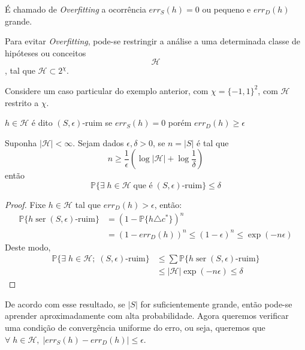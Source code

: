 \begin{definicao}
É chamado de \emph{Overfitting} a ocorrência $err_S(h) = 0$ ou pequeno e $err_D(h)$ grande.
\end{definicao}{}

Para evitar \emph{Overfitting}, pode-se restringir a análise a uma determinada classe de hipóteses ou conceitos $$\mathcal{H}$$, tal que $\mathcal{H} \subset 2^\chi$.

\begin{exemplo}
Considere um caso particular do exemplo anterior, com $\chi = \{-1,1\}^2$, com $\mathcal{H}$ restrito a $\chi$.
\end{exemplo}{}

\begin{definicao}
$h \in \mathcal{H}$ é dito $(S, \epsilon)\text{-ruim}$ se $err_S(h) = 0$ porém $err_D(h) \geq \epsilon$
\end{definicao}{}

\begin{teorema}
Suponha $|\mathcal{H}| < \infty$. Sejam dados  $\epsilon, \delta > 0$, se $n = |S|$ é tal que
\begin{equation*}
n \geq \frac{1}{\epsilon}\left(\log{|\mathcal{H}|} + \log{\frac{1}{\delta}}\right)
\end{equation*}{}
então
\begin{equation*}
    \mathbb{P} \{\exists \; h \in \mathcal{H} \; \text{que é} \; (S, \epsilon)\text{-ruim}\} \leq \delta
\end{equation*}{}
\end{teorema}

\begin{proof}
Fixe $h \in \mathcal{H}$ tal que $err_D(h) > \epsilon$, então:
\begin{align*}
    \mathbb{P}\{h \; \text{ser} \; (S, \epsilon)\text{-ruim}\} &= \left(1 - \mathbb{P}\{h \triangle c^*\}\right)^n \\
    &=(1 - err_D(h))^n \leq (1 - \epsilon)^n \leq \exp(-n\epsilon)
\end{align*}
Deste modo,
\begin{align*}
\mathbb{P}\{\exists \; h \in \mathcal{H}; \; (S, \epsilon)\text{-ruim}\} &\leq \sum{\mathbb{P}\{h \; \text{ser} \; (S, \epsilon)\text{-ruim}\}} \\
&\leq |\mathcal{H}|\exp(-n\epsilon) \leq \delta
\end{align*}
\end{proof}{}

De acordo com esse resultado, se $|S|$ for suficientemente grande, então pode-se aprender aproximadamente com alta probabilidade.
Agora queremos verificar uma condição de convergência uniforme do erro, ou seja, queremos que $\forall \; h \in \mathcal{H}, \; |err_S(h) - err_D(h)| \leq \epsilon$.

